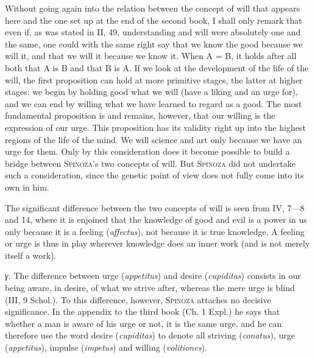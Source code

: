 \documentclass[12pt]{article}
\newcommand{\opage}[1]{\marginnote{\footnotesize\textit{[#1]}}}
\begin{document}
Without going again into the relation between the concept of will that appears here and the one
set up at the end of the second book, I shall only remark that even if, as was stated in II, 49,
understanding and will were absolutely one and the same, one could with the same right say that
we know the good because we will it, \opage{62}and that we will it because we know it.
When A = B, it holds after all both that A is B and that B is A. If we look at the development of
the life of the will, the first proposition can hold at more primitive stages, the latter at
higher stages: we begin by holding good what we will (have a liking and an urge for), and we can
end by willing what we have learned to regard as a good. The most fundamental proposition is and
remains, however, that our willing is the expression of our urge. This proposition has its
validity right up into the highest regions of the life of the mind. We will science and art only
because we have an urge for them. Only by this consideration does it become possible to build a
bridge between \textsc{Spinoza}'s two concepts of will. But \textsc{Spinoza} did not undertake
such a consideration, since the genetic point of view does not fully come into its own in him.

The significant difference between the two concepts of will is seen from IV, 7---8 and 14, where
it is enjoined that the knowledge of good and evil is a power in us only because it is a feeling
(\textit{affectus}), not because it is true knowledge. A feeling or urge is thus in play wherever
knowledge does an inner work (and is not merely itself a work).

\textit{γ.} The difference between urge (\textit{appetitus}) and desire (\textit{cupiditas})
consists in our being aware, in desire, of what we strive after, whereas the mere urge is blind
(III, 9 Schol.). To this difference, however, \textsc{Spinoza} attaches no decisive significance.
In the appendix to the third book (Ch. 1 Expl.) he says that whether a man is aware of his urge
or not, it is the same urge, and he can therefore use the word desire (\textit{cupiditas}) to
denote all striving (\textit{conatus}), urge (\textit{appetitus}), impulse (\textit{impetus})
and willing (\textit{volitiones}).
\end{document}
